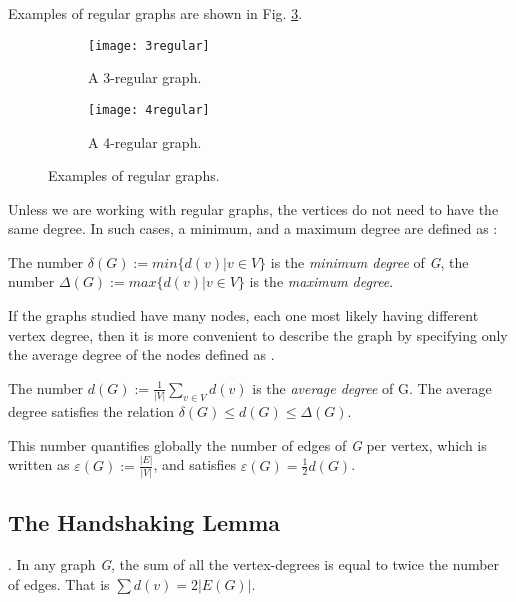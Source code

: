 Examples of regular graphs are shown in Fig. \ref{fig:regular}.

\begin{figure}[h]
	\centering
	\begin{subfigure}[b]{0.4\textwidth}
		\centering
		\texttt{[image: 3regular]}
		\caption{A 3-regular graph.}
		\label{fig:regular3}
	\end{subfigure}
	\hfill
	\begin{subfigure}[b]{0.4\textwidth}
		\centering
		\texttt{[image: 4regular]}
		\caption{A 4-regular graph.}
		\label{fig:regular4}
	\end{subfigure}
	\caption{Examples of regular graphs.}
	\label{fig:regular}
\end{figure}

Unless we are working with regular graphs, the vertices do not need to have the same degree. In such cases, a minimum, and a maximum degree are defined as \cite{diestel}:

\begin{defn}
	The number $\delta(G):=min \{d(v)|v \in V \}$ is the \textit{minimum degree} of \textit{G}, the number $\Delta(G):=max \{d(v)|v \in V \}$ is the \textit{maximum degree}. 
\end{defn} 

If the graphs studied have many nodes, each one most likely having different vertex degree, then it is more convenient to describe the graph by specifying only the average degree of the nodes defined as \cite{diestel}.

\begin{defn}
	The number $d(G):= \frac{1}{|V|} \sum_{v \in V} d(v) $ is the \textit{average degree} of G. The average degree satisfies the relation $\delta(G) \leq d(G) \leq  \Delta(G)$.
\end{defn}

This number quantifies globally the number of edges of \textit{G} per vertex, which is written as $ \varepsilon (G):= \frac{|E|}{|V|}$, and satisfies $ \varepsilon (G)= \frac{1}{2}d(G)$.

\subsection{The Handshaking Lemma}
\begin{lemma}
\label{handshaking}
	\cite{wilsonwatkins}. In any graph \textit{G}, the sum of all the vertex-degrees is equal to twice the number of edges. That is $  \sum d(v)=2|E(G)|$.
\end{lemma}

